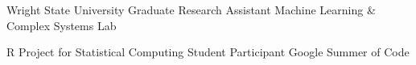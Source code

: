 \documentclass[11pt,a4paper,sans]{moderncv} %
\begin{document}
\vspace{0.75em}

			 {Wright State University}
			 {Graduate Research Assistant}
			 {Machine Learning \& Complex Systems Lab}
			 {}{\vspace{3pt}}
\begin{comment}		
\small
I joined the Machine Learning and Complex Systems lab under a graduate research assistantship to research the possibility of using {\em generative graph models} to understand macroscopic patterns of real-world traffic networks inferred from trajectory (e.g. GPS) data.
Topic areas spanned by the research include \emph{density based clustering}, {\em geospatial analysis}, {\em stochastic block models}.
My masters thesis focused using the {\em cluster tree}---a level-set shape characteristic of an estimated density function---to infer significant clusters of movement. 
This research was supported by the Center for Surveillance Research, a National Science Foundation I/UCRC.
\end{comment}
\vspace{0.75em}

			 {R Project for Statistical Computing}
			 {Student Participant}
			 {Google Summer of Code}
			 {}{\vspace{3pt}}
\begin{comment}		
\small
I received funding for a proposal accepted by the Google Summer of Code (GSOC) Initiative to the R Project for Statistical Computing to explore, develop, and unify developments related the theory of density-based clustering, namely theory related to the {\em cluster tree}. This involved a variety of code development which culminated in the form of an R package; for more details, see the project page.\footnotemark 
\footnotetext{\url{https://summerofcode.withgoogle.com/archive/2017/projects/5919718795902976/}}
\end{comment}
\end{document}
